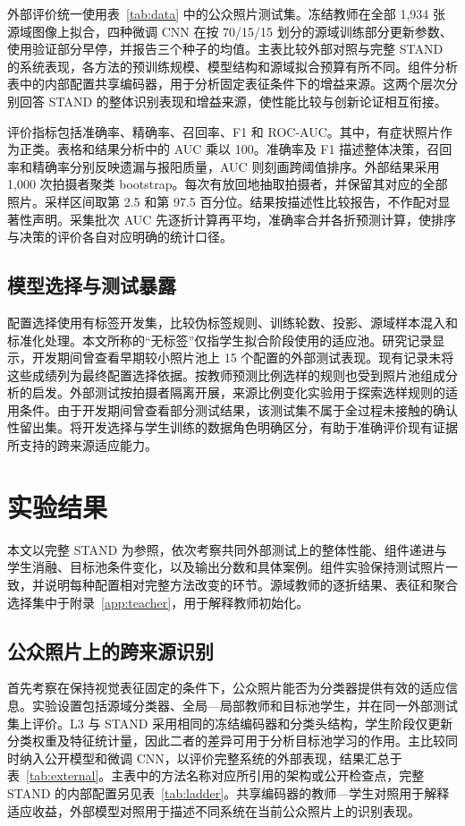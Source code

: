 \documentclass[11pt,a4paper,UTF8,fontset=windows,scheme=plain]{ctexart}
\begin{document}
外部评价统一使用表~\ref{tab:data} 中的公众照片测试集。冻结教师在全部 1,934 张源域图像上拟合，四种微调 CNN 在按 70/15/15 划分的源域训练部分更新参数、使用验证部分早停，并报告三个种子的均值。主表比较外部对照与完整 STAND 的系统表现，各方法的预训练规模、模型结构和源域拟合预算有所不同。组件分析表中的内部配置共享编码器，用于分析固定表征条件下的增益来源。这两个层次分别回答 STAND 的整体识别表现和增益来源，使性能比较与创新论证相互衔接。

评价指标包括准确率、精确率、召回率、F1 和 ROC-AUC。其中，有症状照片作为正类。表格和结果分析中的 AUC 乘以 100。准确率及 F1 描述整体决策，召回率和精确率分别反映遗漏与报阳质量，AUC 则刻画跨阈值排序。外部结果采用 1,000 次拍摄者聚类 bootstrap。每次有放回地抽取拍摄者，并保留其对应的全部照片。采样区间取第 2.5 和第 97.5 百分位。结果按描述性比较报告，不作配对显著性声明。采集批次 AUC 先逐折计算再平均，准确率合并各折预测计算，使排序与决策的评价各自对应明确的统计口径。

\subsection{模型选择与测试暴露}
配置选择使用有标签开发集，比较伪标签规则、训练轮数、投影、源域样本混入和标准化处理。本文所称的“无标签”仅指学生拟合阶段使用的适应池。研究记录显示，开发期间曾查看早期较小照片池上 15 个配置的外部测试表现。现有记录未将这些成绩列为最终配置选择依据。按教师预测比例选样的规则也受到照片池组成分析的启发。外部测试按拍摄者隔离开展，来源比例变化实验用于探索选样规则的适用条件。由于开发期间曾查看部分测试结果，该测试集不属于全过程未接触的确认性留出集。将开发选择与学生训练的数据角色明确区分，有助于准确评价现有证据所支持的跨来源适应能力。


\section{实验结果}
\label{sec:results}
本文以完整 STAND 为参照，依次考察共同外部测试上的整体性能、组件递进与学生消融、目标池条件变化，以及输出分数和具体案例。组件实验保持测试照片一致，并说明每种配置相对完整方法改变的环节。源域教师的逐折结果、表征和聚合选择集中于附录~\ref{app:teacher}，用于解释教师初始化。
\subsection{公众照片上的跨来源识别}
首先考察在保持视觉表征固定的条件下，公众照片能否为分类器提供有效的适应信息。实验设置包括源域分类器、全局—局部教师和目标池学生，并在同一外部测试集上评价。L3 与 STAND 采用相同的冻结编码器和分类头结构，学生阶段仅更新分类权重及特征统计量，因此二者的差异可用于分析目标池学习的作用。主比较同时纳入公开模型和微调 CNN，以评价完整系统的外部表现，结果汇总于表~\ref{tab:external}。主表中的方法名称对应所引用的架构或公开检查点，完整 STAND 的内部配置另见表~\ref{tab:ladder}。共享编码器的教师—学生对照用于解释适应收益，外部模型对照用于描述不同系统在当前公众照片上的识别表现。
\end{document}
